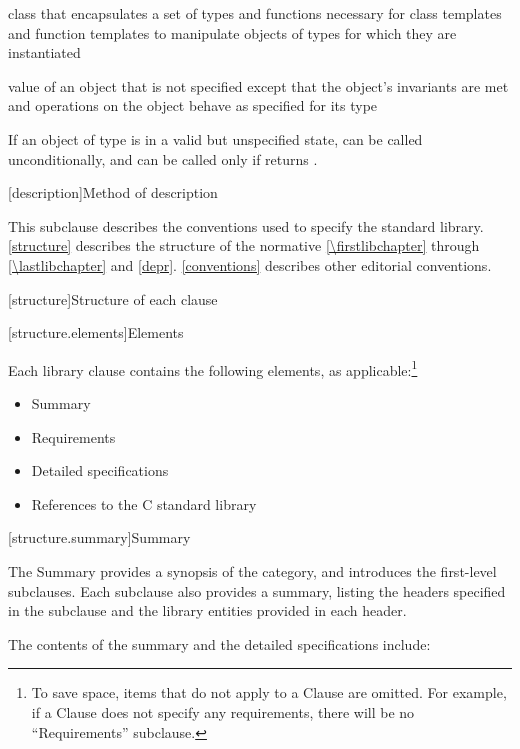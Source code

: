 %
class that encapsulates a set of types and functions necessary for class templates and
function templates to manipulate objects of types for which they are instantiated

%
value of an object that is not specified except that the object's invariants are
met and operations on the object behave as specified for its type

\begin{example}
If an object  of type  is in a
valid but unspecified state,  can be called unconditionally,
and  can be called only if  returns
.
\end{example}

[description]{Method of description}

\pnum
This subclause describes the conventions used to specify the \Cpp{} standard
library. \ref{structure} describes the structure of the normative
\ref{\firstlibchapter} through \ref{\lastlibchapter} and
\ref{depr}. \ref{conventions} describes other editorial conventions.

[structure]{Structure of each clause}

[structure.elements]{Elements}

\pnum
Each library clause contains the following elements, as applicable:\footnote{To
save space, items that do not apply to a Clause are omitted.
For example, if a Clause does not specify any requirements,
there will be no ``Requirements'' subclause.}

\begin{itemize}
\item Summary
\item Requirements
\item Detailed specifications
\item References to the C standard library
\end{itemize}

[structure.summary]{Summary}

\pnum
The Summary provides a synopsis of the category, and introduces the first-level subclauses.
Each subclause also provides a summary, listing the headers specified in the
subclause and the library entities provided in each header.

\pnum
The contents of the summary and the detailed specifications include:

